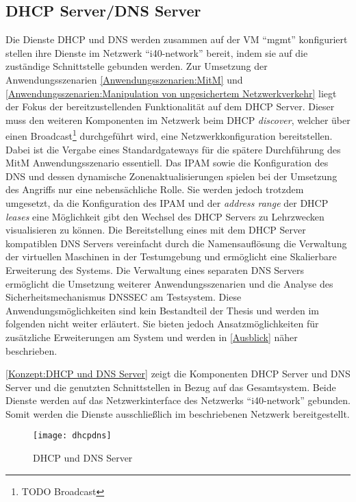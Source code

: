 \subsection{\ac{DHCP} Server/\ac{DNS} Server}
Die Dienste \ac{DHCP} und \ac{DNS} werden zusammen auf der \ac{VM} "`mgmt"' konfiguriert stellen ihre Dienste im Netzwerk "`i40-network"' bereit, indem sie auf die zuständige Schnittstelle gebunden werden. Zur Umsetzung der Anwendungsszenarien \autoref{Anwendungsszenarien:MitM} und \autoref{Anwendungsszenarien:Manipulation von ungesichertem Netzwerkverkehr} liegt der Fokus der bereitzustellenden Funktionalität auf dem \ac{DHCP} Server. Dieser muss den weiteren Komponenten im Netzwerk beim \ac{DHCP} \textit{discover}, welcher über einen Broadcast\footnote{TODO Broadcast} durchgeführt wird, eine Netzwerkkonfiguration bereitstellen. Dabei ist die Vergabe eines Standardgateways für die spätere Durchführung des \ac{MitM} Anwendungsszenario essentiell. Das \ac{IPAM} sowie die Konfiguration des \ac{DNS} und dessen dynamische Zonenaktualisierungen spielen bei der Umsetzung des Angriffs nur eine nebensächliche Rolle. Sie werden jedoch trotzdem umgesetzt, da die Konfiguration des \ac{IPAM} und der \textit{address range} der \ac{DHCP} \textit{leases} eine Möglichkeit gibt den Wechsel des \ac{DHCP} Servers zu Lehrzwecken visualisieren zu können. Die Bereitstellung eines mit dem \ac{DHCP} Server kompatiblen \ac{DNS} Servers vereinfacht durch die Namensauflösung die Verwaltung der virtuellen Maschinen in der Testumgebung und ermöglicht eine Skalierbare Erweiterung des Systems. Die Verwaltung eines separaten \ac{DNS} Servers ermöglicht die Umsetzung weiterer Anwendungsszenarien und die Analyse des Sicherheitsmechanismus \ac{DNSSEC} am Testsystem. Diese Anwendungsmöglichkeiten sind kein Bestandteil der Thesis und werden im folgenden nicht weiter erläutert. Sie bieten jedoch Ansatzmöglichkeiten für zusätzliche Erweiterungen am System und werden in \autoref{Ausblick} näher beschrieben.

\autoref{Konzept:DHCP und DNS Server} zeigt die Komponenten \ac{DHCP} Server und \ac{DNS} Server und die genutzten Schnittstellen in Bezug auf das Gesamtsystem. Beide Dienste werden auf das Netzwerkinterface des Netzwerks "`i40-network"' gebunden. Somit werden die Dienste ausschließlich im beschriebenen Netzwerk bereitgestellt.

\begin{figure}[h]
  \centering
  \texttt{[image: dhcpdns]}
  \caption{DHCP und DNS Server} 
  \label{Konzept:DHCP und DNS Server}
\end{figure}

